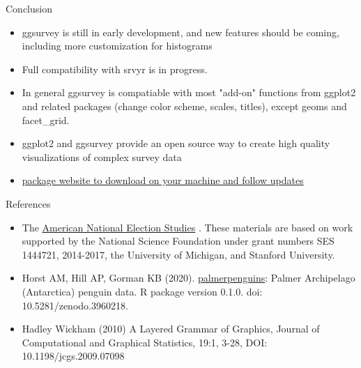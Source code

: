 \documentclass{beamer}\usepackage[]{graphicx}\usepackage[]{xcolor}
\begin{document}
\begin{frame}{Conclusion}
\begin{itemize}
\item ggsurvey is still in early development, and new features should be coming, including more customization for histograms
\item Full compatibility with srvyr is in progress.
\item In general ggsurvey is compatiable with most "add-on" functions from ggplot2 and related packages  (change color scheme, scales, titles), except geoms and facet\_grid.
\item ggplot2 and ggsurvey provide an open source way to create high quality visualizations of complex survey data
\item \href{https://github.com/balexanderstats/ggsurvey}{package website to download on your machine and follow updates}
\end{itemize}
\end{frame}

\begin{frame}{References}
\begin{itemize}
\item The \href{https://electionstudies.org/}{American National Election Studies} . These materials are based on work supported by the National Science Foundation under grant numbers SES 1444721, 2014-2017, the University of Michigan, and Stanford University.
\item Horst AM, Hill AP, Gorman KB (2020). \href{https://allisonhorst.github.io/palmerpenguins/}{palmerpenguins}: Palmer Archipelago (Antarctica) penguin data. R package version 0.1.0.
 doi:   10.5281/zenodo.3960218.
\item Hadley Wickham (2010) A Layered Grammar of Graphics, Journal of Computational and Graphical Statistics, 19:1, 3-28, DOI: 10.1198/jcgs.2009.07098

\end{itemize}
\end{frame}
\end{document}
